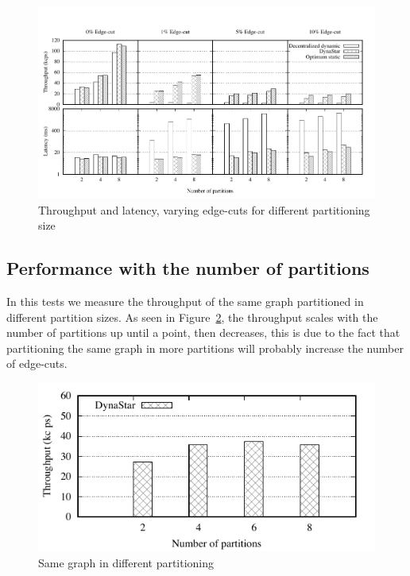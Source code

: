 \begin{figure}[ht!]
	\includegraphics{figures/experiments/throughput-latency-avg-all}
	\caption{Throughput and latency, varying edge-cuts for different partitioning size}
	\label{fig:varying_edge_cut}
\end{figure}


\subsection{Performance with the number of partitions}
\label{sec:evaluation:results}
In this tests we measure the throughput of the same graph partitioned in different
partition sizes. As seen in Figure~\ref{fig:4p1p_varying_partition_size}, the throughput
scales with the number of partitions up until a point, then decreases, this is due to
the fact that partitioning the same graph in more partitions will probably increase the number of
edge-cuts.

\begin{figure}[ht]
	\includegraphics{figures/experiments/throughput-avg-vary-partition}
	\caption{Same graph in different partitioning}
	\label{fig:4p1p_varying_partition_size}
\end{figure}


